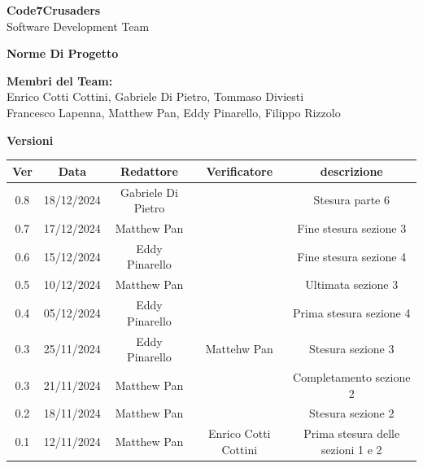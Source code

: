 \documentclass{article}
\begin{document}
\begin{titlepage}
    \vspace{1cm}
    
    {\Huge \textbf{Code7Crusaders}}\\
    \vspace{0.5cm}
    {\Large Software Development Team}\\
    \vspace{2cm}
    
    \large \textbf{Norme Di Progetto}
    \vspace{3.9cm}

    \textbf{Membri del Team:}\\
    Enrico Cotti Cottini, Gabriele Di Pietro, Tommaso Diviesti \\
    Francesco Lapenna, Matthew Pan, Eddy Pinarello, Filippo Rizzolo \\
    \vspace{0.5cm}
    
    \vspace{1cm}
\end{titlepage}



\newpage
\begin{center}
    \textbf{Versioni}
    \\
    \vspace{0.3cm}
    \begin{tabular}{|c|c|c|c|c|}
        \hline
        \textbf{Ver} & \textbf{Data} & \textbf{Redattore} & \textbf{Verificatore} & \textbf{descrizione}\\
        \hline
        0.8 & 18/12/2024 & Gabriele Di Pietro &               & Stesura parte 6 \\ 
        0.7 & 17/12/2024 & Matthew Pan &                      & Fine stesura sezione 3\\
        0.6 & 15/12/2024 & Eddy Pinarello &                   & Fine stesura sezione 4\\
        0.5 & 10/12/2024 & Matthew Pan &                      & Ultimata sezione 3\\
        0.4 & 05/12/2024 & Eddy Pinarello &                   & Prima stesura sezione 4\\
        0.3 & 25/11/2024 & Eddy Pinarello  & Mattehw Pan       & Stesura sezione 3\\
        0.3 & 21/11/2024 & Matthew Pan &                      & Completamento sezione 2\\
        0.2 & 18/11/2024 & Matthew Pan &                      & Stesura sezione 2\\
        0.1 & 12/11/2024 & Matthew Pan & Enrico Cotti Cottini & Prima stesura delle sezioni 1 e 2\\
        \hline
    \end{tabular}
\end{center}
\end{document}
